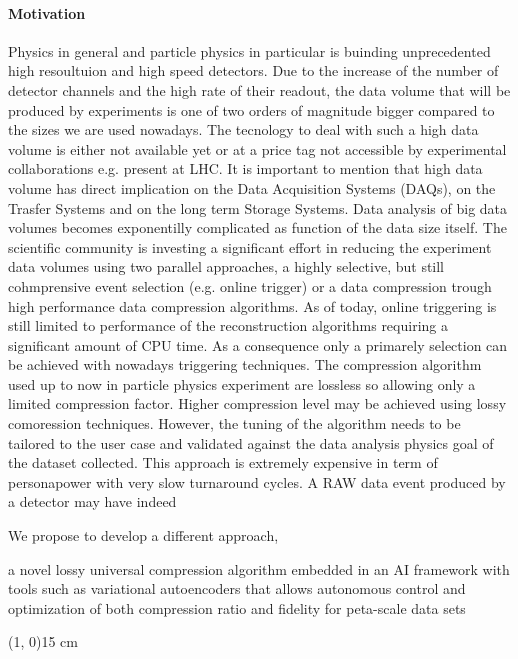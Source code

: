 \paragraph{Motivation}

Physics in general and particle physics in particular is buinding unprecedented high resoultuion and high speed detectors. 
Due to the increase of the number of detector channels and the high rate of their readout, the data volume that will be produced by experiments is one of two orders of magnitude bigger compared to the sizes we are used nowadays. The tecnology to deal with such a high data volume is either not available yet or at a price tag not accessible by experimental collaborations e.g. present at LHC. It is important to mention that high data volume has direct implication on the Data Acquisition Systems (DAQs), on the Trasfer Systems and on the long term Storage Systems. Data analysis of big data volumes becomes exponentilly complicated as function of the data size itself. The scientific community is investing a significant effort in reducing the experiment data volumes using two parallel approaches, a highly selective, but still cohmprensive event selection (e.g. online trigger) or a data compression trough high performance data compression algorithms. 
As of today, online triggering is still limited to performance of the reconstruction algorithms requiring a significant amount of CPU time. As a consequence only a primarely selection can be achieved with nowadays triggering techniques. The compression algorithm used up to now in particle physics experiment are lossless so allowing only a limited compression factor. Higher compression level may be achieved using lossy comoression techniques. However, the tuning of the algorithm needs to be tailored to the user case and validated against the data analysis physics goal of the dataset collected. This approach is extremely expensive in term of personapower with very slow turnaround cycles. A RAW data event produced by a detector may have indeed   

We propose to develop a different  approach,



a novel lossy universal compression algorithm embedded in an AI framework with tools such as variational autoencoders that allows autonomous control and optimization of both compression ratio and fidelity for peta-scale data sets



\line(1, 0){15 cm}

